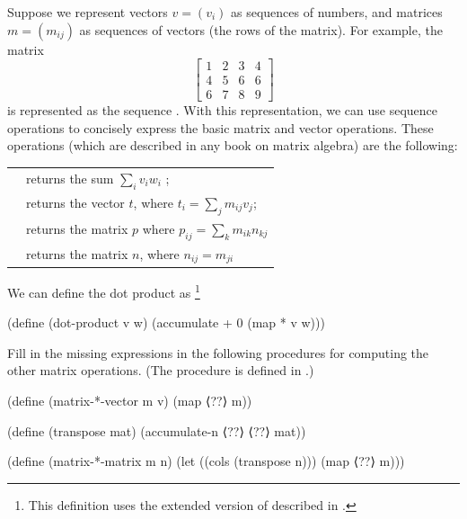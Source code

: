 \begin{exercise}
	\label{Exercise 2.37}
	Suppose we represent vectors \( v = (v_i) \) as sequences of numbers, and matrices \( m = (m_{ij}) \) as sequences of vectors (the rows of the matrix).
	For example, the matrix
	\[
	\begin{bmatrix}
		1 & 2 & 3 & 4 \\
		4 & 5 & 6 & 6 \\
		6 & 7 & 8 & 9
	\end{bmatrix}
	\]
	is represented as the sequence .
	With this representation, we can use sequence operations to concisely express the basic matrix and vector operations.
	These operations (which are described in any book on matrix algebra) are the following:
	\begin{center}
	\begin{tabular}{ll}
		\code{(dot-product v w)}
		&
		returns the sum \( ∑_i v_i w_i \) ;
		\\
		\code{(matrix-*-vector m v)}
		&
		returns the vector \( t \), where \( t_i = ∑_j m_{ij} v_j \);
		\\
		\code{(matrix-*-matrix m n)}
		&
		returns the matrix \( p \) where \( p_{ij} = ∑_k m_{ik} n_{kj} \)
		\\
		\code{(transpose m)}
		&
		returns the matrix \( n \), where \( n_{ij} = m_{ji} \)
	\end{tabular}
	\end{center}
	We can define the dot product as%
	\footnote{
		This definition uses the extended version of  described in .
	}
	\begin{scheme}
	  (define (dot-product v w)
	    (accumulate + 0 (map * v w)))
	\end{scheme}
	Fill in the missing expressions in the following procedures for computing the other matrix operations.
	(The procedure  is defined in .)
	\begin{scheme}
	  (define (matrix-*-vector m v)
	    (map ⟨??⟩ m))

	  (define (transpose mat)
	    (accumulate-n ⟨??⟩ ⟨??⟩ mat))

	  (define (matrix-*-matrix m n)
	    (let ((cols (transpose n)))
	      (map ⟨??⟩ m)))
	\end{scheme}
\end{exercise}



